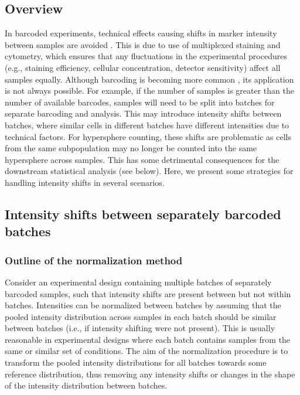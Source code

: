 \documentclass{article}
\begin{document}
\subsection{Overview}
In barcoded experiments, technical effects causing shifts in marker intensity between samples are avoided \cite{zunder2015palladium}.
This is due to use of multiplexed staining and cytometry, which ensures that any fluctuations in the experimental procedures (e.g., staining efficiency, cellular concentration, detector sensitivity) affect all samples equally.
Although barcoding is becoming more common \cite{gaudilliere2014delayed,gaudilliere2015implementing}, its application is not always possible.
For example, if the number of samples is greater than the number of available barcodes, samples will need to be split into batches for separate barcoding and analysis.
This may introduce intensity shifts between batches, where similar cells in different batches have different intensities due to technical factors.
For hypersphere counting, these shifts are problematic as cells from the same subpopulation may no longer be counted into the same hypersphere across samples.
This has some detrimental consequences for the downstream statistical analysis (see below).
Here, we present some strategies for handling intensity shifts in several scenarios.

\subsection{Intensity shifts between separately barcoded batches}
\label{sec:intnorm}

\subsubsection{Outline of the normalization method}
Consider an experimental design containing multiple batches of separately barcoded samples, such that intensity shifts are present between but not within batches.
Intensities can be normalized between batches by assuming that the pooled intensity distribution across samples in each batch should be similar between batches (i.e., if intensity shifting were not present).
This is usually reasonable in experimental designs where each batch contains samples from the same or similar set of conditions.
The aim of the normalization procedure is to transform the pooled intensity distributions for all batches towards some reference distribution, thus removing any intensity shifts or changes in the shape of the intensity distribution between batches.
\end{document}
